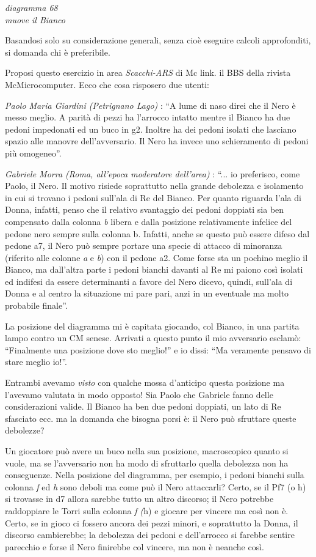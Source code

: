 \documentclass[
]{article}
\begin{document}
\emph{diagramma 68}\\
\emph{muove il Bianco}

Basandosi solo su considerazione generali, senza cioè eseguire calcoli
approfonditi, si domanda chi è preferibile.

Proposi questo esercizio in area \emph{Scacchi-ARS} di Mc link. il BBS
della rivista McMicrocomputer. Ecco che cosa risposero due utenti:

\emph{Paolo Maria Giardini (Petrignano Lago)} : ``A lume di naso direi
che il Nero è messo meglio. A parità di pezzi ha l'arrocco intatto
mentre il Bianco ha due pedoni impedonati ed un buco in g2. Inoltre ha
dei pedoni isolati che lasciano spazio alle manovre dell'avversario. Il
Nero ha invece uno schieramento di pedoni più omogeneo''.

\emph{Gabriele Morra (Roma, all'epoca moderatore dell'area)} : ``... io
preferisco, come Paolo, il Nero. Il motivo risiede soprattutto nella
grande debolezza e isolamento in cui si trovano i pedoni sull'ala di Re
del Bianco. Per quanto riguarda l'ala di Donna, infatti, penso che il
relativo svantaggio dei pedoni doppiati sia ben compensato dalla colonna
\emph{b} libera e dalla posizione relativamente infelice del pedone nero
sempre sulla colonna b. Infatti, anche se questo può essere difeso dal
pedone a7, il Nero può sempre portare una specie di attacco di minoranza
(riferito alle colonne \emph{a} e \emph{b}) con il pedone a2. Come forse
sta un pochino meglio il Bianco, ma dall'altra parte i pedoni bianchi
davanti al Re mi paiono così isolati ed indifesi da essere determinanti
a favore del Nero dicevo, quindi, sull'ala di Donna e al centro la
situazione mi pare pari, anzi in un eventuale ma molto probabile
finale''.

La posizione del diagramma mi è capitata giocando, col Bianco, in una
partita lampo contro un CM senese. Arrivati a questo punto il mio
avversario esclamò: ``Finalmente una posizione dove sto meglio!'' e io
dissi: ``Ma veramente pensavo di stare meglio io!''.

Entrambi avevamo \emph{visto} con qualche mossa d'anticipo questa
posizione ma l'avevamo valutata in modo opposto! Sia Paolo che Gabriele
fanno delle considerazioni valide. Il Bianco ha ben due pedoni doppiati,
un lato di Re sfasciato ecc. ma la domanda che bisogna porsi è: il Nero
può sfruttare queste debolezze?

Un giocatore può avere un buco nella sua posizione, macroscopico quanto
si vuole, ma se l'avversario non ha modo di sfruttarlo quella debolezza
non ha conseguenze. Nella posizione del diagramma, per esempio, i pedoni
bianchi sulla colonna \emph{f} ed \emph{h} sono deboli ma come può il
Nero attaccarli? Certo, se il Pf7 (o h) si trovasse in d7 allora sarebbe
tutto un altro discorso; il Nero potrebbe raddoppiare le Torri sulla
colonna \emph{f (}h) e giocare per vincere ma così non è. Certo, se in
gioco ci fossero ancora dei pezzi minori, e soprattutto la Donna, il
discorso cambierebbe; la debolezza dei pedoni e dell'arrocco si farebbe
sentire parecchio e forse il Nero finirebbe col vincere, ma non è
neanche così.
\end{document}
